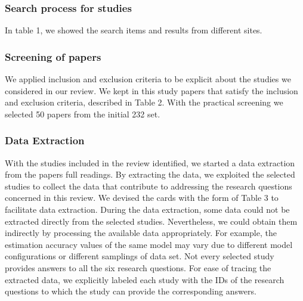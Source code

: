 \documentclass[two column]{ieeeaccess}
\begin{document}
\subsubsection{Search process for studies}
In table 1, we showed the search items and results from different sites.

\subsubsection{Screening of papers}
We applied inclusion and exclusion criteria to be explicit about the studies we considered in our review. We kept in this study papers that satisfy the inclusion and exclusion criteria, described in Table 2. With the practical screening we selected 50 papers from the initial 232 set.
 
\subsubsection{Data Extraction}
With the studies included in the review identified, we started a data extraction from the papers full readings. By extracting the data, we exploited the selected studies to collect the data that contribute to addressing the research questions concerned in this review. We devised the cards with the form of Table 3 to facilitate data extraction. During the data extraction, some data could not be extracted directly from the selected studies. Nevertheless, we could obtain them indirectly by processing the available data appropriately. For example, the estimation accuracy values of the same model may vary due to different model configurations or different samplings of data set. Not every selected study provides answers to all the six research questions. For ease of tracing the extracted data, we explicitly labeled each study with the IDs of the research questions to which the study can provide the corresponding answers.
\end{document}

